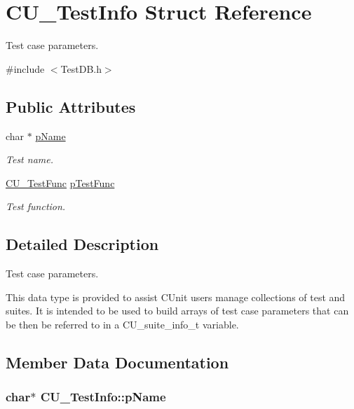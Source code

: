 \hypertarget{struct_c_u___test_info}{\section{C\+U\+\_\+\+Test\+Info Struct Reference}
\label{struct_c_u___test_info}
}


Test case parameters.  




{\ttfamily \#include $<$Test\+D\+B.\+h$>$}

\subsection*{Public Attributes}
\begin{DoxyCompactItemize}
\item 
char $\ast$ \hyperlink{struct_c_u___test_info_a9b79e7b8c366a6076bb0ba2cd066c222}{p\+Name}
\begin{DoxyCompactList}\small\item\em Test name. \end{DoxyCompactList}\item 
\hyperlink{group___framework_ga5868148b642b30635b8fe7f095c5b493}{C\+U\+\_\+\+Test\+Func} \hyperlink{struct_c_u___test_info_a8b01dd299cfa2ba6b972fea808e7b007}{p\+Test\+Func}
\begin{DoxyCompactList}\small\item\em Test function. \end{DoxyCompactList}\end{DoxyCompactItemize}


\subsection{Detailed Description}
Test case parameters. 

This data type is provided to assist C\+Unit users manage collections of test and suites. It is intended to be used to build arrays of test case parameters that can be then be referred to in a C\+U\+\_\+suite\+\_\+info\+\_\+t variable. 

\subsection{Member Data Documentation}
\hypertarget{struct_c_u___test_info_a9b79e7b8c366a6076bb0ba2cd066c222}{
\subsubsection[{p\+Name}]{\setlength{\rightskip}{0pt plus 5cm}char$\ast$ C\+U\+\_\+\+Test\+Info\+::p\+Name}}\label{struct_c_u___test_info_a9b79e7b8c366a6076bb0ba2cd066c222}


